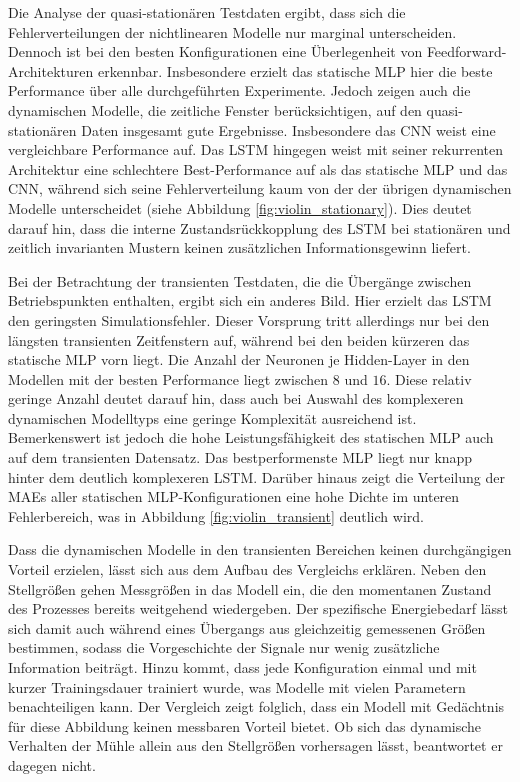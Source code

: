 Die Analyse der quasi-stationären Testdaten ergibt, dass sich die Fehlerverteilungen der nichtlinearen Modelle nur marginal unterscheiden. Dennoch ist bei den besten Konfigurationen eine Überlegenheit von Feedforward-Architekturen erkennbar. Insbesondere erzielt das statische \ac{MLP} hier die beste Performance über alle durchgeführten Experimente. Jedoch zeigen auch die dynamischen Modelle, die zeitliche Fenster berücksichtigen, auf den quasi-stationären Daten insgesamt gute Ergebnisse. Insbesondere das \ac{CNN} weist eine vergleichbare Performance auf. Das \ac{LSTM} hingegen weist mit seiner rekurrenten Architektur eine schlechtere Best-Performance auf als das statische \ac{MLP} und das \ac{CNN}, während sich seine Fehlerverteilung kaum von der der übrigen dynamischen Modelle unterscheidet (siehe Abbildung \ref{fig:violin_stationary}). Dies deutet darauf hin, dass die interne Zustandsrückkopplung des \ac{LSTM} bei stationären und zeitlich invarianten Mustern keinen zusätzlichen Informationsgewinn liefert. \par
Bei der Betrachtung der transienten Testdaten, die die Übergänge zwischen Betriebspunkten enthalten, ergibt sich ein anderes Bild. Hier erzielt das \ac{LSTM} den geringsten Simulationsfehler. Dieser Vorsprung tritt allerdings nur bei den längsten transienten Zeitfenstern auf, während bei den beiden kürzeren das statische \ac{MLP} vorn liegt. Die Anzahl der Neuronen je Hidden-Layer in den Modellen mit der besten Performance liegt zwischen $8$ und $16$. Diese relativ geringe Anzahl deutet darauf hin, dass auch bei Auswahl des komplexeren dynamischen Modelltyps eine geringe Komplexität ausreichend ist. Bemerkenswert ist jedoch die hohe Leistungsfähigkeit des statischen \ac{MLP} auch auf dem transienten Datensatz. Das bestperformenste \ac{MLP} liegt nur knapp hinter dem deutlich komplexeren \ac{LSTM}. Darüber hinaus zeigt die Verteilung der MAEs aller statischen \ac{MLP}-Konfigurationen eine hohe Dichte im unteren Fehlerbereich, was in Abbildung \ref{fig:violin_transient} deutlich wird.\par
Dass die dynamischen Modelle in den transienten Bereichen keinen durchgängigen Vorteil erzielen, lässt sich aus dem Aufbau des Vergleichs erklären. Neben den Stellgrößen gehen Messgrößen in das Modell ein, die den momentanen Zustand des Prozesses bereits weitgehend wiedergeben. Der spezifische Energiebedarf lässt sich damit auch während eines Übergangs aus gleichzeitig gemessenen Größen bestimmen, sodass die Vorgeschichte der Signale nur wenig zusätzliche Information beiträgt. Hinzu kommt, dass jede Konfiguration einmal und mit kurzer Trainingsdauer trainiert wurde, was Modelle mit vielen Parametern benachteiligen kann. Der Vergleich zeigt folglich, dass ein Modell mit Gedächtnis für diese Abbildung keinen messbaren Vorteil bietet. Ob sich das dynamische Verhalten der Mühle allein aus den Stellgrößen vorhersagen lässt, beantwortet er dagegen nicht.\par
